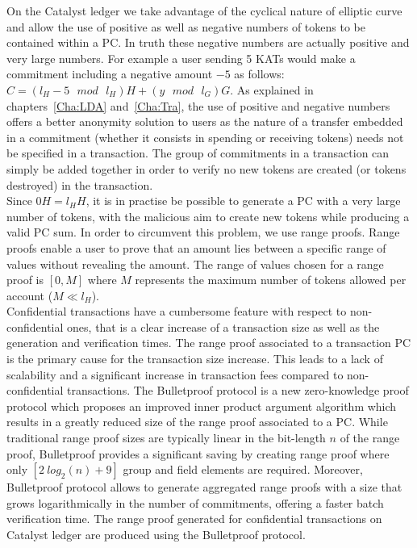 \textcolor{bulg}{On the Catalyst ledger we take advantage of the cyclical nature of elliptic curve and allow the use of positive as well as negative numbers of tokens to be contained within a PC. In truth these negative numbers are actually positive and very large numbers. For example a user sending 5 KATs would make a commitment including a negative amount $-5$ as follows: $C = (l_H - 5 \text{ $mod$ } l_H) H + (y \text{ $mod$ } l_G) G$. As explained in chapters~\ref{Cha:LDA} and~\ref{Cha:Tra}, the use of positive and negative numbers offers a better anonymity solution to users as the nature of a transfer embedded in a commitment (whether it consists in spending or receiving tokens) needs not be specified in a transaction. The group of commitments in a transaction can simply be added together in order to verify no new tokens are created (or tokens destroyed) in the transaction.} \\

Since $0H=l_HH$, it is in practise be possible to generate a PC with a very large number of tokens, with the malicious aim to create new tokens while producing a valid PC sum. In order to circumvent this problem, we use range proofs. Range proofs enable a user to prove that an amount lies between a specific range of values without revealing the amount. The range of values chosen for a range proof is $[0,M]$ where $M$ represents the maximum number of tokens allowed per account ($M \ll l_H$).\\

Confidential transactions have a cumbersome feature with respect to non-confidential ones, that is a clear increase of a transaction size as well as the generation and verification times. The range proof associated to a transaction PC is the primary cause for the transaction size increase. This leads to a lack of scalability and a significant increase in transaction fees compared to non-confidential transactions. The Bulletproof protocol is a new zero-knowledge proof protocol \cite{bulletproof} which proposes an improved inner product argument algorithm which results in a greatly reduced size of the range proof associated to a PC.  While traditional range proof sizes are typically linear in the bit-length $n$ of the range proof, Bulletproof provides a significant saving by creating range proof where only $[2~log_2(n) + 9]$ group and field elements are required. Moreover, Bulletproof protocol allows to generate aggregated range proofs with a size that grows logarithmically in the number of commitments, offering a faster batch verification time.  The range proof generated for confidential transactions on Catalyst ledger are produced using the Bulletproof protocol. 
